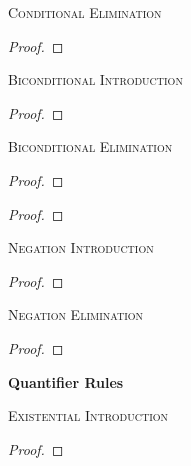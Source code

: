 \pagebreak
\textsc{Conditional Elimination}

\begin{proof}
	 
\end{proof}

\textsc{Biconditional Introduction}

\begin{proof}
	\open
		 
	\close
	\open
		 
	\close
\end{proof}

\textsc{Biconditional Elimination}

\begin{proof}
	 
\end{proof}

\begin{proof}
	 
\end{proof}



\textsc{Negation Introduction}

\begin{proof}
	\open
		 
	\close
\end{proof}

\textsc{Negation Elimination}

\begin{proof}
	\open
		 
	\close
\end{proof}








\newpage

{\LARGE \bf Quantifier Rules}

\textsc{Existential Introduction}

\begin{proof}
	 
\end{proof}

